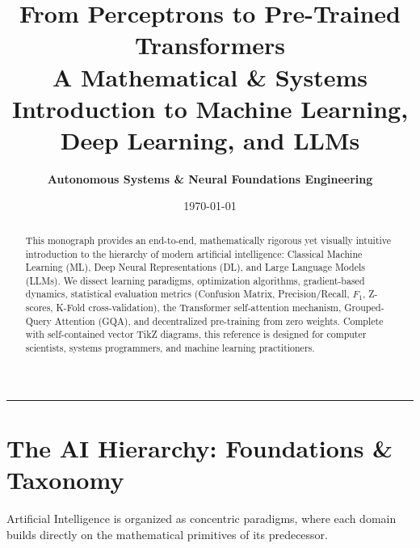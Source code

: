 \documentclass[11pt,a4paper]{article}
\title{
    \vspace{-1.5cm}
    \textbf{\huge From Perceptrons to Pre-Trained Transformers} \\[0.3cm]
    \large A Mathematical \& Systems Introduction to Machine Learning, Deep Learning, and LLMs
}
\author{\textbf{Autonomous Systems \& Neural Foundations Engineering}}
\date{\today}
\begin{document}
\maketitle

\begin{abstract}
This monograph provides an end-to-end, mathematically rigorous yet visually intuitive introduction to the hierarchy of modern artificial intelligence: Classical Machine Learning (ML), Deep Neural Representations (DL), and Large Language Models (LLMs). We dissect learning paradigms, optimization algorithms, gradient-based dynamics, statistical evaluation metrics (Confusion Matrix, Precision/Recall, $F_1$, Z-scores, K-Fold cross-validation), the Transformer self-attention mechanism, Grouped-Query Attention (GQA), and decentralized pre-training from zero weights. Complete with self-contained vector TikZ diagrams, this reference is designed for computer scientists, systems programmers, and machine learning practitioners.
\end{abstract}

\tableofcontents
\vspace{0.8cm}
\hrule
\vspace{0.8cm}

\section{The AI Hierarchy: Foundations \& Taxonomy}

Artificial Intelligence is organized as concentric paradigms, where each domain builds directly on the mathematical primitives of its predecessor.
\end{document}

